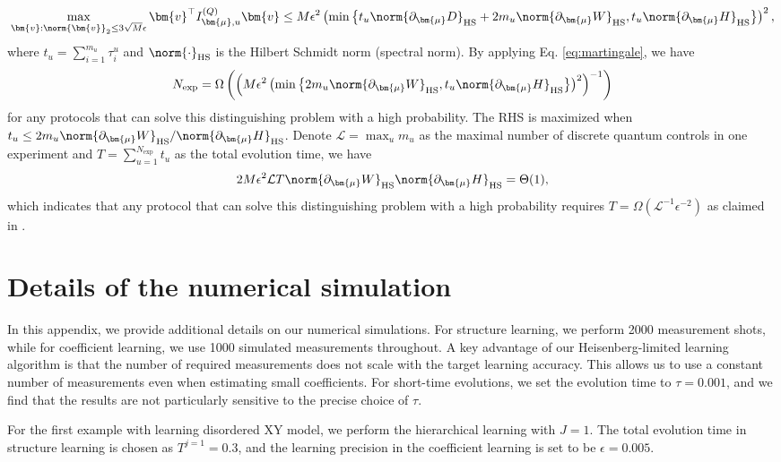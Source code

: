 \documentclass[twocolumn,superscriptaddress,aps,showpacs,amsmath,amstex,amssymb,citeautoscript,floatfix,pra,preprintnumbers]{revtex4-2}
\newcounter{alg}
\theoremstyle{plain}
\theoremstyle{plain}
\theoremstyle{plain}
\theoremstyle{plain}
\theoremstyle{plain}
\theoremstyle{plain}
\begin{document}
\begin{appendix}
\begin{align}
\max_{\bm{v}:\norm{\bm{v}}_2\leq 3\sqrt{M}\epsilon}\bm{v}^\top I^{(Q)}_{{\bm{\mu}},u}\bm{v}\leq M\epsilon^2\left(\min\left\{t_u\norm{\partial_{\bm{\mu}} D}_{\text{HS}}+2m_u\norm{\partial_{\bm{\mu}} W}_{\text{HS}},t_u\norm{\partial_{\bm{\mu}} H}_{\text{HS}}\right\}\right)^2,
\end{align}
where $t_u=\sum_{i=1}^{m_u}\tau_i^u$ and $\norm{\cdot}_{\text{HS}}$ is the Hilbert Schmidt norm (spectral norm). By applying Eq. \eqref{eq:martingale}, we have
\begin{align}
N_{\exp}=\Omega\left(\left(M\epsilon^2\left(\min\left\{2m_u\norm{\partial_{\bm{\mu}} W}_{\text{HS}},t_u\norm{\partial_{\bm{\mu}} H}_{\text{HS}}\right\}\right)^2\right)^{-1}\right)
\end{align}
for any protocols that can solve this distinguishing problem with a high probability. The RHS is maximized when $t_u\leq2m_u\norm{\partial_{\bm{\mu}} W}_{\text{HS}}/\norm{\partial_{\bm{\mu}} H}_{\text{HS}}$. Denote $\mathcal{L}=\max_u m_u$ as the maximal number of discrete quantum controls in one experiment and $T=\sum_{u=1}^{N_{\text{exp}}} t_u$ as the total evolution time, we have
\begin{align}
2M\epsilon^2\mathcal{L}T\norm{\partial_{\bm{\mu}} W}_{\text{HS}}\norm{\partial_{\bm{\mu}} H}_{\text{HS}}=\Theta(1),
\end{align}
which indicates that any protocol that can solve this distinguishing problem with a high probability requires $T=\Omega(\mathcal{L}^{-1}\epsilon^{-2})$ as claimed in .


\section{Details of the numerical simulation}
\label{sec:numerics_details}
In this appendix, we provide additional details on our numerical simulations. For structure learning, we perform 2000 measurement shots, while for coefficient learning, we use 1000 simulated measurements throughout. A key advantage of our Heisenberg-limited learning algorithm is that the number of required measurements does not scale with the target learning accuracy. This allows us to use a constant number of measurements even when estimating small coefficients. For short-time evolutions, we set the evolution time to $\tau = 0.001$, and we find that the results are not particularly sensitive to the precise choice of $\tau$.

For the first example with learning disordered XY model, we perform the hierarchical learning with $J=1$. The total evolution time in structure learning is chosen as $T^{j=1}=0.3$, and the learning precision in the coefficient learning is set to be $\epsilon=0.005$.


\end{appendix}
\end{document}

